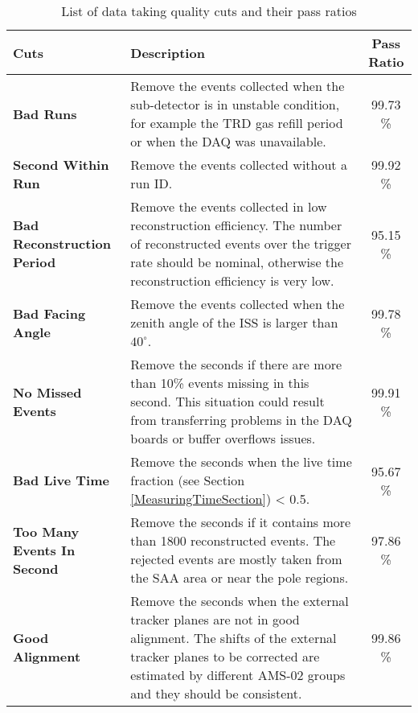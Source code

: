 \begin{table}[tp]
\renewcommand\arraystretch{1.3}
\caption{List of data taking quality cuts and their pass ratios}
\label{data taking quality cuts}
\begin{tabular}{l p{7.5cm}  c} 
\hline
Cuts & Description & Pass Ratio \\
\hline

\textbf{Bad Runs}                                &  Remove the events collected when the sub-detector is in unstable condition, for example the TRD gas refill period or when the DAQ was unavailable.                & 99.73 \% \\
\textbf{Second Within Run}                 & Remove the events collected without a run ID.            & 99.92  \% \\
\textbf{Bad Reconstruction Period}     & Remove the events collected in low reconstruction efficiency. The number of reconstructed events over the trigger rate should be nominal, otherwise the reconstruction efficiency is very low.                            & 95.15  \%  \\
\textbf{Bad Facing Angle}                    & Remove the events collected when the zenith angle of the ISS is larger than $40^{\circ}$.                              & 99.78  \% \\
\textbf{No Missed Events}                   & Remove the seconds if there are more than 10\% events missing in this second. This situation could result from transferring problems in the DAQ boards or buffer overflows issues.                                                         &    99.91 \% \\
\textbf{Bad Live Time}                         & Remove the seconds when the live time fraction (see Section \ref{MeasuringTimeSection}) < 0.5.        & 95.67  \% \\
\textbf{Too Many Events In Second}   & Remove the seconds if it contains more than 1800 reconstructed events. The rejected events are mostly taken from the SAA area or near the pole regions.                     & 97.86  \% \\
\textbf{Good Alignment}                      & Remove the seconds when the external tracker planes are not in good alignment. The shifts of the external tracker planes to be corrected are estimated by different AMS-02 groups and they should be consistent.                     & 99.86  \% \\

\end{tabular}
\end{table}
